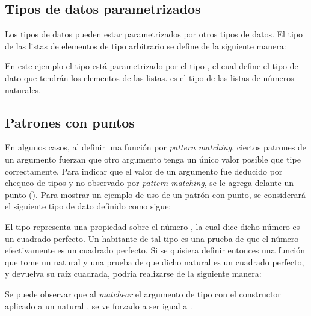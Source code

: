 \subsection{Tipos de datos parametrizados}\label{parametrized}

Los tipos de datos pueden estar parametrizados por otros tipos de datos. El tipo de las listas de elementos de tipo arbitrario se define de la siguiente manera:


En este ejemplo el tipo  está parametrizado por el tipo , el cual define el tipo de dato que tendrán los elementos de las listas.   es el tipo de las listas de números naturales. 


\subsection{Patrones con puntos}

En algunos casos, al definir una función por \textit{pattern matching}, ciertos patrones de un argumento fuerzan que otro argumento tenga un único valor posible que tipe correctamente. Para indicar que el valor de un argumento fue deducido por chequeo de tipos y no observado por \textit{pattern matching},  se le agrega delante un punto (). Para mostrar un ejemplo de uso de un patrón con punto, se considerará el siguiente tipo de dato  definido como sigue:



El tipo   representa una propiedad sobre el número , la cual dice
dicho número es un cuadrado perfecto. Un habitante de tal tipo es una prueba de que el número  efectivamente es un cuadrado perfecto. Si se quisiera definir entonces una función  que tome un natural y una prueba de que dicho natural es un cuadrado perfecto, y devuelva su raíz cuadrada, podría realizarse de la siguiente manera:


Se puede observar que al \textit{matchear} el argumento de tipo   con el constructor  aplicado a un natural ,  se ve forzado a ser igual a  \AgdaFunction{*} .


